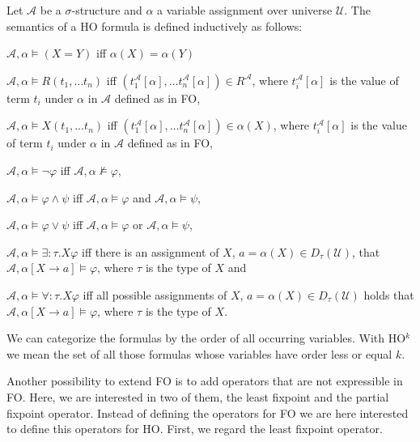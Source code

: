 \begin{definition}
    Let $\mathcal{A}$ be a $\sigma$-structure and $\alpha$ a variable assignment over universe $\mathcal{U}$. The
    semantics of a HO formula is defined inductively as follows:
    \begin{compactitem}
        \item $\mathcal{A}, \alpha \models (X = Y)$ iff $\alpha(X) = \alpha(Y)$
        \item $\mathcal{A}, \alpha \models R(t_1, \dots t_n)$ iff $(t_1^{\mathcal{A}}[\alpha], \dots
        t_n^{\mathcal{A}}[\alpha]) \in R^{\mathcal{A}}$, where $t_i^{\mathcal{A}}[\alpha]$ is the value of term
        $t_i$ under $\alpha$ in $\mathcal{A}$ defined as in FO,
        \item $\mathcal{A}, \alpha \models X(t_1, \dots t_n)$ iff $(t_1^{\mathcal{A}}[\alpha], \dots
        t_n^{\mathcal{A}}[\alpha]) \in \alpha(X)$, where $t_i^{\mathcal{A}}[\alpha]$ is the value of term
        $t_i$ under $\alpha$ in $\mathcal{A}$ defined as in FO,
        \item $\mathcal{A}, \alpha \models \neg\varphi$ iff $\mathcal{A}, \alpha\not\models\varphi$,
        \item $\mathcal{A}, \alpha \models \varphi \wedge \psi$ iff $\mathcal{A}, \alpha\models\varphi$ and $\mathcal{A},
        \alpha\models\psi$,
        \item $\mathcal{A}, \alpha \models \varphi \vee \psi$ iff $\mathcal{A}, \alpha\models\varphi$ or $\mathcal{A},
        \alpha\models\psi$,
        \item $\mathcal{A}, \alpha \models \exists \colon \tau.X\varphi$ iff there is an assignment of $X$, $a = \alpha
        (X) \in D_{\tau}
        (\mathcal{U})$, that $\mathcal{A}, \alpha[X \rightarrow a] \models \varphi$, where $\tau$ is the type of $X$ and
        \item $\mathcal{A}, \alpha \models \forall\colon \tau.X\varphi$ iff all possible assignments of $X$, $a =
        \alpha(X) \in
        D_{\tau}(\mathcal{U})$ holds that $\mathcal{A}, \alpha[X \rightarrow a] \models \varphi$, where $\tau$ is the
        type of
        $X$.
        \end{compactitem}
\end{definition}

We can categorize the formulas by the order of all occurring variables. With HO$^k$ we mean the set of all those
formulas whose variables have order less or equal $k$.

Another possibility to extend FO is to add operators that are not expressible in FO. Here, we are interested in two
of them, the least fixpoint and the partial fixpoint operator. Instead of defining the operators for FO we are
here interested to define this operators for HO. First, we regard the least fixpoint operator.

